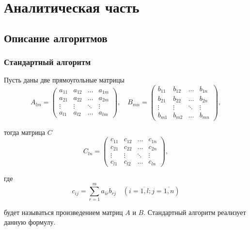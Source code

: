 \chapter{Аналитическая часть}

\section{Описание алгоритмов}

\subsection{Стандартный алгоритм}

Пусть даны две прямоугольные матрицы
\begin{equation}
	A_{lm} = \begin{pmatrix}
		a_{11} & a_{12} & \ldots & a_{1m}\\
		a_{21} & a_{22} & \ldots & a_{2m}\\
		\vdots & \vdots & \ddots & \vdots\\
		a_{l1} & a_{l2} & \ldots & a_{lm}
	\end{pmatrix},
	\quad
	B_{mn} = \begin{pmatrix}
		b_{11} & b_{12} & \ldots & b_{1n}\\
		b_{21} & b_{22} & \ldots & b_{2n}\\
		\vdots & \vdots & \ddots & \vdots\\
		b_{m1} & b_{m2} & \ldots & b_{mn}
	\end{pmatrix},
\end{equation}

тогда матрица $C$
\begin{equation}
	C_{ln} = \begin{pmatrix}
		c_{11} & c_{12} & \ldots & c_{1n}\\
		c_{21} & c_{22} & \ldots & c_{2n}\\
		\vdots & \vdots & \ddots & \vdots\\
		c_{l1} & c_{l2} & \ldots & c_{ln}
	\end{pmatrix},
\end{equation}

где
\begin{equation}
	\label{eq:M}
	c_{ij} =
	\sum_{r=1}^{m} a_{ir}b_{rj} \quad (i=\overline{1,l}; j=\overline{1,n})
\end{equation}

будет называться произведением матриц $A$ и $B$.
Стандартный алгоритм реализует данную формулу.

